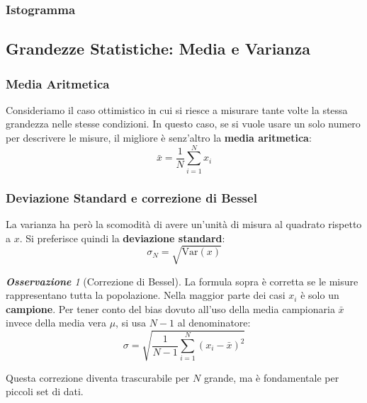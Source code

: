 \documentclass[openany,a4paper,12pt]{book}
\theoremstyle{remark}
\newtheorem{osservazione}{\textbf{\color{ForestGreen}Osservazione}}
\begin{document}
\subsubsection{Istogramma}

\begin{center}
\end{center}





\subsection*{Grandezze Statistiche: Media e Varianza}
\subsubsection{Media Aritmetica}

Consideriamo il caso ottimistico in cui si riesce a misurare tante volte la stessa grandezza nelle stesse condizioni. In questo caso, se si vuole usare un solo numero per descrivere le misure, il migliore è senz'altro la \textbf{media aritmetica}:
\begin{equation}
    \bar{x} = \frac{1}{N} \sum_{i=1}^{N} x_i
\end{equation}

\subsubsection{Deviazione Standard e correzione di Bessel}
La varianza ha però la scomodità di avere un'unità di misura al quadrato rispetto a $x$. Si preferisce quindi la \textbf{deviazione standard}:
\[ \sigma_N = \sqrt{\text{Var}(x)} \]

\begin{osservazione}[Correzione di Bessel]
La formula sopra è corretta se le misure rappresentano tutta la popolazione. Nella maggior parte dei casi $x_i$ è solo un \textbf{campione}. Per tener conto del bias dovuto all'uso della media campionaria $\bar{x}$ invece della media vera $\mu$, si usa $N-1$ al denominatore:
\begin{equation}
    \sigma = \sqrt{\frac{1}{N-1} \sum_{i=1}^{N} (x_i - \bar{x})^2}
\end{equation}
\end{osservazione}
Questa correzione diventa trascurabile per $N$ grande, ma è fondamentale per piccoli set di dati.
\end{document}

